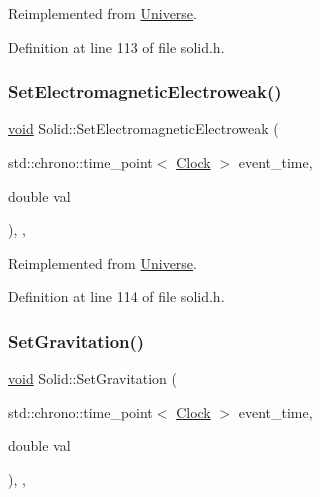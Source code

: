 Reimplemented from \mbox{\hyperlink{class_universe_aa981fc7e252b1fbbb675f0371860954d}{Universe}}.



Definition at line 113 of file solid.\+h.

\mbox{\label{class_solid_a6617ae9fe4707d760a23b54eddf00dec}} 
\subsubsection{\texorpdfstring{Set\+Electromagnetic\+Electroweak()}{SetElectromagneticElectroweak()}}
{\footnotesize\ttfamily \mbox{\hyperlink{glad_8h_a950fc91edb4504f62f1c577bf4727c29}{void}} Solid\+::\+Set\+Electromagnetic\+Electroweak (\begin{DoxyParamCaption}\item[{std\+::chrono\+::time\+\_\+point$<$ \mbox{\hyperlink{universe_8h_a0ef8d951d1ca5ab3cfaf7ab4c7a6fd80}{Clock}} $>$}]{event\+\_\+time,  }\item[{double}]{val }\end{DoxyParamCaption})\hspace{0.3cm}{\ttfamily [inline]}, {\ttfamily [final]}, {\ttfamily [virtual]}}



Reimplemented from \mbox{\hyperlink{class_universe_a608aa95698380f791a0ffba45cc1bee3}{Universe}}.



Definition at line 114 of file solid.\+h.

\mbox{\label{class_solid_ae237f2c713868c133e28ed7f75fc9125}} 
\subsubsection{\texorpdfstring{Set\+Gravitation()}{SetGravitation()}}
{\footnotesize\ttfamily \mbox{\hyperlink{glad_8h_a950fc91edb4504f62f1c577bf4727c29}{void}} Solid\+::\+Set\+Gravitation (\begin{DoxyParamCaption}\item[{std\+::chrono\+::time\+\_\+point$<$ \mbox{\hyperlink{universe_8h_a0ef8d951d1ca5ab3cfaf7ab4c7a6fd80}{Clock}} $>$}]{event\+\_\+time,  }\item[{double}]{val }\end{DoxyParamCaption})\hspace{0.3cm}{\ttfamily [inline]}, {\ttfamily [final]}, {\ttfamily [virtual]}}



